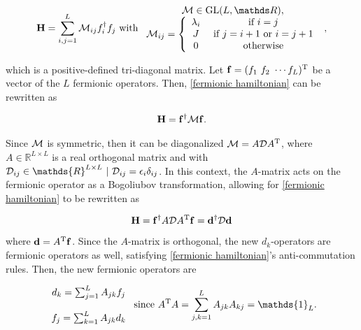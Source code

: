 \documentclass{homework}
\begin{document}
\begin{equation}
    {\bf H} = \sum_{i, j = 1}^{L} \M_{ij} f_i^{\dagger} f_j \textnormal{ with } \begin{array}{c}
         \M \in \textnormal{GL}(L, \R), \\
         \M_{ij} = \left\{\begin{array}{cc}
             \lambda_i & \textnormal{ if } i=j  \\
              J & \textnormal{ if } j=i+1 \textnormal{ or } i = j + 1 \\
              0 & \textnormal{ otherwise}
         \end{array} \right.
    \end{array},
\end{equation}

which is a positive-defined tri-diagonal matrix.
Let ${\bf f} = (f_1 \textnormal{ } f_2 \textnormal{ } \cdots f_L)^{\textnormal{T}}$ be a vector of the $L$ fermionic operators. Then, \eqref{fermionic hamiltonian} can be rewritten as 

\begin{align}
    {\bf H} = {\bf f}^\dagger \mathcal{M} {\bf f}.
\end{align}

Since $\mathcal{M}$ is symmetric, then it can be diagonalized  $\mathcal{M} = A \mathcal{D} A^{\textnormal{T}}$, where $A \in \mathds{R}^{L \times L}$ is a real orthogonal matrix and with $\mathcal{D}_{ij} \in \mathds{R}^{L \times L} \blanky | \blanky \mathcal{D}_{ij}  = \epsilon_i \delta_{ij}$. In this context, the $A$-matrix acts on the fermionic operator as a Bogoliubov transformation, allowing for \eqref{fermionic hamiltonian} to be rewritten as 

\begin{equation}
     {\bf H} = {\bf f}^\dagger A \mathcal{D} A^{\textnormal{T}} {\bf f} = {\bf d}^\dagger \mathcal{D} {\bf d}
     \label{fermionic matrix hamiltonian}
\end{equation}

where ${\bf d} = A^{\textnormal{T}} {\bf f}$. Since the $A$-matrix is orthogonal, the new $d_k$-operators are fermionic operators as well, satisfying \eqref{fermionic hamiltonian}'s anti-commutation rules. Then, the new fermionic operators are 

\begin{equation*}
    \begin{array}{c}
         d_k = \sum_{j=1}^{L} A_{jk} f_j  \\ 
         \\
         f_j = \sum_{k=1}^{L} A_{jk} d_k 
    \end{array} \textnormal{ since } A\transpose A = \sum_{j,k = 1}^{L} A_{jk} A_{kj} = \mathds{1}_{L}.
\end{equation*}
\end{document}
